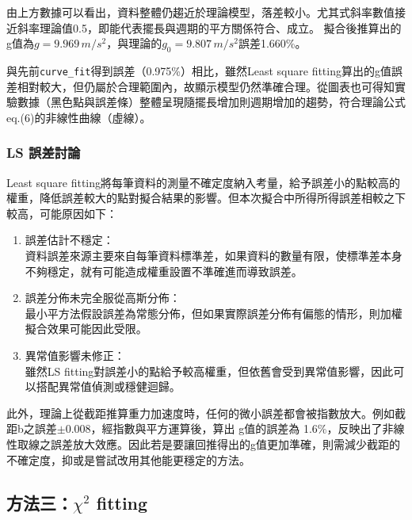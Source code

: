 \documentclass[12pt,a4paper]{article}
\begin{document}
\begin{CJK}{UTF8}{bkai}
由上方數據可以看出，資料整體仍趨近於理論模型，落差較小。尤其式斜率數值接近斜率理論值0.5，即能代表擺長與週期的平方關係符合、成立。
擬合後推算出的g值為$g = 9.969\,m/s^2$，與理論的$g_0 = 9.807\,m/s^2$誤差1.660\%。

與先前\texttt{curve\_fit}得到誤差（0.975\%）相比，雖然Least square fitting算出的g值誤差相對較大，但仍屬於合理範圍內，故顯示模型仍然準確合理。從圖表也可得知實驗數據（黑色點與誤差條）整體呈現隨擺長增加則週期增加的趨勢，符合理論公式eq.(6)的非線性曲線（虛線）。

\subsubsection{LS 誤差討論}
\hfill

Least square fitting將每筆資料的測量不確定度納入考量，給予誤差小的點較高的權重，降低誤差較大的點對擬合結果的影響。但本次擬合中所得所得誤差相較之下較高，可能原因如下：

\begin{enumerate}
    \item 誤差估計不穩定：\\資料誤差來源主要來自每筆資料標準差，如果資料的數量有限，使標準差本身不夠穩定，就有可能造成權重設置不準確進而導致誤差。
    \item 誤差分佈未完全服從高斯分佈：\\最小平方法假設誤差為常態分佈，但如果實際誤差分佈有偏態的情形，則加權擬合效果可能因此受限。
    \item 異常值影響未修正：\\雖然LS fitting對誤差小的點給予較高權重，但依舊會受到異常值影響，因此可以搭配異常值偵測或穩健迴歸。
\end{enumerate}

此外，理論上從截距推算重力加速度時，任何的微小誤差都會被指數放大。例如截距b之誤差$\pm0.008$，經指數與平方運算後，算出 g值的誤差為 1.6\%，反映出了非線性取線之誤差放大效應。因此若是要讓回推得出的g值更加準確，則需減少截距的不確定度，抑或是嘗試改用其他能更穩定的方法。


\clearpage

\subsection{方法三：$\chi^2$ fitting}
\hfill


\end{CJK}
\end{document}
